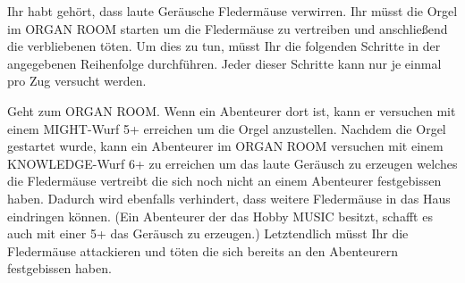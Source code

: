 





Ihr habt gehört, dass laute Geräusche Fledermäuse verwirren. Ihr müsst die Orgel im ORGAN ROOM starten um die Fledermäuse zu vertreiben und anschließend die verbliebenen töten. Um dies zu tun, müsst Ihr die folgenden Schritte in der angegebenen Reihenfolge durchführen. Jeder dieser Schritte kann nur je einmal pro Zug versucht werden.

  \begin{itemize}
        \bitem Geht zum ORGAN ROOM. Wenn ein Abenteurer dort ist, kann er versuchen mit einem MIGHT-Wurf 5+ erreichen um die Orgel anzustellen.
        \bitem Nachdem die Orgel gestartet wurde, kann ein Abenteurer im ORGAN ROOM versuchen mit einem KNOWLEDGE-Wurf 6+ zu erreichen um das laute Geräusch zu erzeugen welches die Fledermäuse vertreibt die sich noch nicht an einem Abenteurer festgebissen haben. Dadurch wird ebenfalls verhindert, dass weitere Fledermäuse in das Haus eindringen können. (Ein Abenteurer der das Hobby MUSIC besitzt, schafft es auch mit einer 5+ das Geräusch zu erzeugen.)
        \bitem Letztendlich müsst Ihr die Fledermäuse attackieren und töten die sich bereits an den Abenteurern festgebissen haben.
    \end{itemize}

